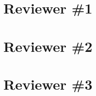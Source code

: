 \documentclass{article}
\begin{document}
\section{Reviewer \#1}

\section{Reviewer \#2}

\section{Reviewer \#3}
\end{document}
